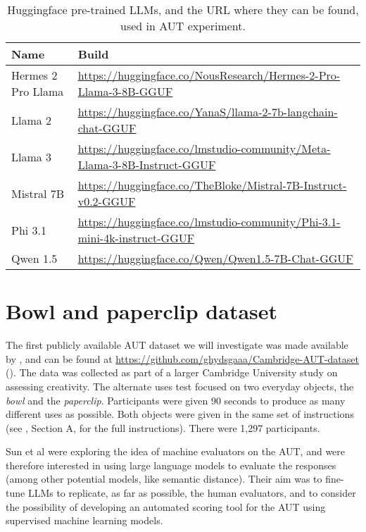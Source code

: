 \documentclass{article}
\begin{document}
\begin{table}
\centering
\begin{tabular}{ll}
\textbf{Name} & \textbf{Build}  \\ 
\toprule
Hermes 2 Pro Llama & \url{https://huggingface.co/NousResearch/Hermes-2-Pro-Llama-3-8B-GGUF} \\
Llama 2 & \url{https://huggingface.co/YanaS/llama-2-7b-langchain-chat-GGUF} \\
Llama 3 & \url{https://huggingface.co/lmstudio-community/Meta-Llama-3-8B-Instruct-GGUF} \\
Mistral 7B  & \url{https://huggingface.co/TheBloke/Mistral-7B-Instruct-v0.2-GGUF} \\
Phi 3.1 & \url{https://huggingface.co/lmstudio-community/Phi-3.1-mini-4k-instruct-GGUF} \\
Qwen 1.5 & \url{https://huggingface.co/Qwen/Qwen1.5-7B-Chat-GGUF} \\ 
\bottomrule
\end{tabular}
\vspace{2mm}
\caption{Huggingface pre-trained LLMs, and the URL where they can be found, used in AUT experiment.}
\label{sec2:modelstable}
\end{table}

\section{Bowl and paperclip dataset}
\label{sec:bowl_and_paperclip}

The first publicly available AUT dataset we will investigate was made available by \cite{Sun_2024}, and can be found at \url{https://github.com/ghydsgaaa/Cambridge-AUT-dataset} (\cite{AUTdataset}). The data was collected as part of a larger Cambridge University study on assessing creativity. The alternate uses test focused on two everyday objects, the \textit{bowl} and the \textit{paperclip}. Participants were given 90 seconds to produce as many different uses as possible. Both objects were given in the same set of instructions (see \cite{Sun_2024}, Section A, for the full instructions). There were 1,297 participants.   

Sun et al were exploring the idea of machine evaluators on the AUT, and were therefore interested in using large language models to evaluate the responses (among other potential models, like semantic distance). Their aim was to fine-tune LLMs to replicate, as far as possible, the human evaluators, and to consider the possibility of developing an automated scoring tool for the AUT using supervised machine learning models.   
\end{document}
